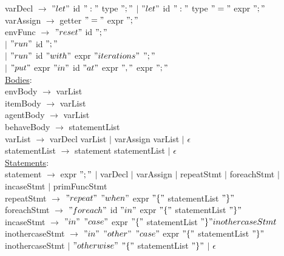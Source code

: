 \documentclass{article}
\begin{document}
varDecl $\rightarrow$ $"let"$ id $":"$ type $";"$ $\vert$ $"let"$ id $":"$ type $"="$ expr $";"$ \\

varAssign $\rightarrow$ getter $"="$ expr $";"$ \\

envFunc $\rightarrow$ $"reset"$ id $";"$ \\
$\vert$ $"run"$ id $";"$\\
$\vert$ $"run"$ id $"with"$ expr $"iterations"$ $";"$\\
$\vert$ $"put"$ expr $"in"$ id $"at"$ expr $","$ expr  $";"$\\

\underline{Bodies}: \\

envBody $\rightarrow$ varList \\

itemBody $\rightarrow$ varList \\

agentBody $\rightarrow$ varList \\

behaveBody $\rightarrow$ statementList \\

varList $\rightarrow$ varDecl varList $\vert$ varAssign varList $\vert$ $\epsilon$ \\

statementList $\rightarrow$ statement statementList $\vert$ $\epsilon$ \\

\underline{Statements}: \\

statement $\rightarrow$ expr $";"$ $\vert$ varDecl $\vert$ varAssign $\vert$ repeatStmt $\vert$ foreachStmt $\vert$ incaseStmt $\vert$ primFuncStmt \\

repeatStmt $\rightarrow$ $"repeat"$ $"when"$ expr $"\{"$ statementList  $"\}"$ \\

foreachStmt $\rightarrow$ $"foreach"$ id $"in"$ expr $"\{"$ statementList  $"\}"$ \\

incaseStmt $\rightarrow$  $"in"$  $"case"$ expr $"\{"$ statementList  $"\}" inothercaseStmt$\\

inothercaseStmt $\rightarrow$  $"in"$ $"other"$  $"case"$ expr $"\{"$ statementList  $"\}"$ inothercaseStmt $\vert$ $"otherwise"$ $"\{"$ statementList  $"\}"$ $\vert$ $\epsilon$ \\  
\end{document}
